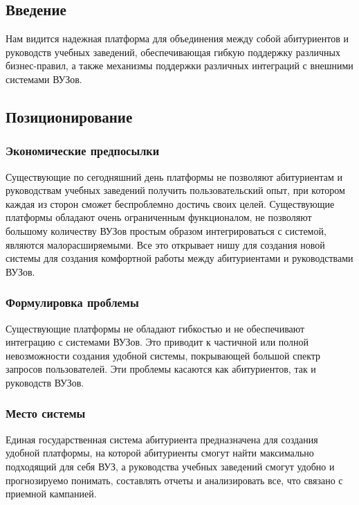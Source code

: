 \documentclass[a4paper, 14pt]{extarticle}
\begin{document}
\subsection*{Введение}

Нам видится надежная платформа для объединения между собой абитуриентов и
руководств учебных заведений, обеспечивающая гибкую поддержку различных
бизнес-правил, а также механизмы поддержки различных интеграций с внешними
системами ВУЗов.

\subsection*{Позиционирование}

\subsubsection*{Экономические предпосылки}

Существующие по сегодняшний день платформы не позволяют абитуриентам и
руководствам учебных заведений получить пользовательский опыт, при котором
каждая из сторон сможет беспроблемно достичь своих целей. Существующие платформы
обладают очень ограниченным функционалом, не позволяют большому количеству ВУЗов
простым образом интегрироваться с системой, являются малорасширяемыми. Все это
открывает нишу для создания новой системы для создания комфортной работы между
абитуриентами и руководствами ВУЗов.

\subsubsection*{Формулировка проблемы}

Существующие платформы не обладают гибкостью и не обеспечивают интеграцию с
системами ВУЗов. Это приводит к частичной или полной невозможности создания
удобной системы, покрывающей большой спектр запросов пользователей. Эти проблемы
касаются как абитуриентов, так и руководств ВУЗов.

\subsubsection*{Место системы}

Единая государственная система абитуриента предназначена для создания удобной
платформы, на которой абитуриенты смогут найти максимально подходящий для себя
ВУЗ, а руководства учебных заведений смогут удобно и прогнозируемо понимать,
составлять отчеты и анализировать все, что связано с приемной кампанией.
\end{document}

